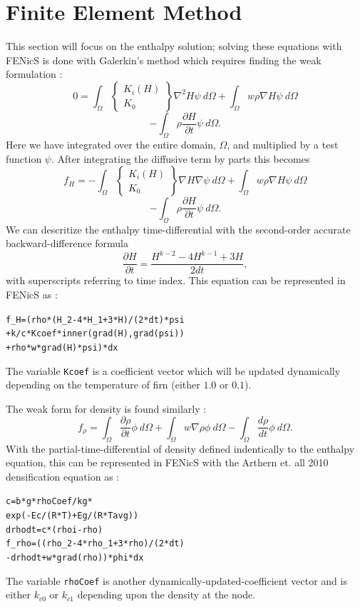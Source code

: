 \documentclass{article}%
\begin{document}
\section{Finite Element Method}

This section will focus on the enthalpy solution; solving these equations with FENicS is done with Galerkin's method which requires finding the weak formulation :
  $$
    0 =
    \int_{\Omega} 
      \begin{Bmatrix}
        K_i(H)\\
        K_0
      \end{Bmatrix}
      \nabla^2 H \psi\ d \Omega 
    + \int_{\Omega}w \rho \nabla H \psi\ d \Omega
  $$
  $$
    - \int_{\Omega} {\rho \frac{\partial H}{\partial t}} \psi\ d \Omega.
  $$
Here we have integrated over the entire domain, $\Omega$, and multiplied by a test function $\psi$.  After integrating the diffusive term by parts this becomes
  $$
    f_H =
    - \int_{\Omega} 
        \begin{Bmatrix}
          K_i(H)\\
          K_0
        \end{Bmatrix}
        \nabla H \nabla \psi\ d \Omega 
    + \int_{\Omega}w \rho \nabla H \psi\ d \Omega
  $$
  $$
    - \int_{\Omega} {\rho \frac{\partial H}{\partial t}} \psi\ d \Omega.
  $$
We can descritize the enthalpy time-differential with the second-order accurate backward-difference formula
  $$\frac{\partial H}{\partial t} = \frac{H^{k-2} - 4H^{k-1} + 3H}{2dt},$$
with superscripts referring to time index.  This equation can be represented in FENicS as :
\small
\begin{alltt}
f_H = (rho*(H_2 - 4*H_1 + 3*H)/(2*dt)*psi 
      + k/c*Kcoef*inner(grad(H), grad(psi))
      + rho*w*grad(H)*psi)*dx
\end{alltt}
\normalsize
The variable \texttt{Kcoef} is a coefficient vector which will be updated dynamically depending on the temperature of firn (either $1.0$ or $0.1$).

The weak form for density is found similarly :
  $$
  f_{\rho} = 
    \int_{\Omega} \frac{\partial \rho}{\partial t}\phi\ d \Omega + 
    \int_{\Omega} w\nabla \rho \phi\ d \Omega -
    \int_{\Omega}\frac{d \rho}{dt}\phi\ d \Omega.
  $$
With the partial-time-differential of density defined indentically to the enthalpy equation, this can be represented in FENicS with the Arthern et. all 2010 densification equation as :
\small
\begin{alltt}
c      = b*g*rhoCoef/kg * 
         exp(-Ec/(R*T) + Eg/(R*Tavg))
drhodt = c*(rhoi - rho)
f_rho  = ((rho_2 - 4*rho_1 + 3*rho)/(2*dt) 
         - drhodt + w*grad(rho))*phi*dx 
\end{alltt}
\normalsize
The variable \texttt{rhoCoef} is another dynamically-updated-coefficient vector and is either $k_{c0}$ or $k_{c1}$ depending upon the density at the node.
\end{document}
